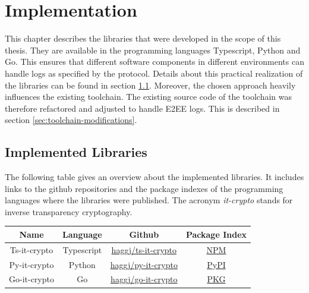 \documentclass[../main.tex]{subfiles}
\begin{document}
\chapter{Implementation}
\label{chap:implementation}

This chapter describes the libraries that were developed in the scope of this thesis.
They are available in the programming languages Typescript, Python and Go.
This ensures that different software components in different environments can handle logs as specified by the protocol.
Details about this practical realization of the libraries can be found in section \ref{sec:implemented-libraries}.
Moreover, the chosen approach heavily influences the existing toolchain.
The existing source code of the toolchain was therefore refactored and adjusted to handle E2EE logs.
This is described in section \ref{sec:toolchain-modifications}.

\section{Implemented Libraries}
\label{sec:implemented-libraries}

The following table gives an overview about the implemented libraries.
It includes links to the github repositories and the package indexes of the programming languages where the libraries were published.
The acronym \textit{it-crypto} stands for inverse transparency cryptography.

\begin{table}[ht]
    \centering
    \begin{tabular}{|c|c|c|c|}
    \hline
    Name         & Language & Github                           & Package Index                                    \\ \hline
    Ts-it-crypto & Typescript           & \href{https://github.com/haggj/ts-it-crypto}{haggj/ts-it-crypto} & \href{https://www.npmjs.com/package/ts-it-crypto}{NPM}       \\ \hline
    Py-it-crypto & Python               & \href{https://github.com/haggj/py-it-crypto}{haggj/py-it-crypto} & \href{https://pypi.org/project/py-it-crypto/}{PyPI}          \\ \hline
    Go-it-crypto & Go                   & \href{https://github.com/haggj/go-it-crypto}{haggj/go-it-crypto} & \href{https://pkg.go.dev/github.com/haggj/go-it-crypto}{PKG} \\ \hline
    \end{tabular}
\end{table}
\end{document}
